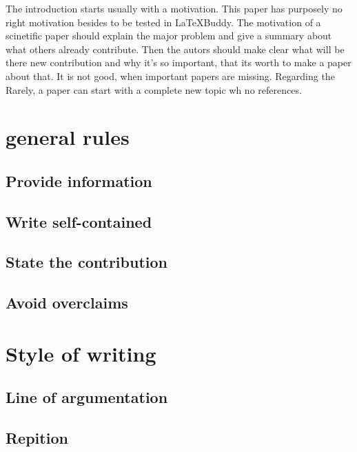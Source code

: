 \documentclass[12pt,a4paper]{article}
\begin{document}
The introduction starts usually with a motivation. This paper has purposely no right motivation besides to be tested in \LaTeX{}Buddy. The motivation of a scinetific paper should explain the major problem and give a summary about what others already contribute. Then the autors should make clear what will be there new contribution and why it's so important, that its worth to make a paper about that.
It is not good, when important papers are missing. Regarding the Rarely, a paper can start with a complete new topic wh no references.

\section{general rules}%

\subsection{Provide information}
\subsection{Write self-contained}
\subsection{State the contribution}
\subsection{Avoid overclaims}
\section{Style of writing}
\subsection{Line of argumentation}
\subsection{Repition}
\end{document}
